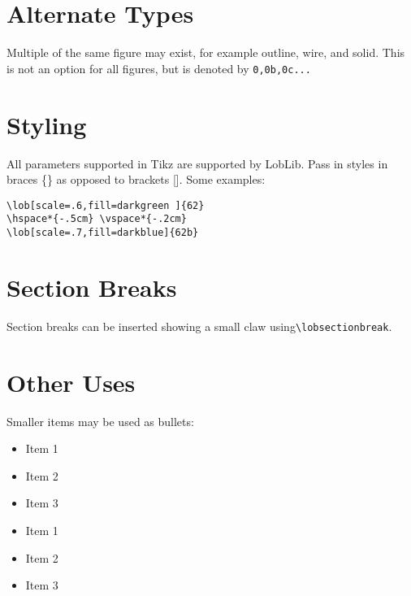 \documentclass[11pt]{article}
\begin{document}
\section*{Alternate Types}
Multiple of the same figure may exist, for example outline, wire, and solid. This is not an option for all figures, but is denoted by \texttt{0,0b,0c...}\\

\vspace*{1em}




\pagebreak

\section*{Styling}
All parameters supported in Tikz are supported by LobLib. Pass in styles in braces \{\} as opposed to brackets []. Some examples:
\vspace*{1cm}

\begin{multicols}{2}
\begin{verbatim}
\lob[scale=.6,fill=darkgreen ]{62}   
\hspace*{-.5cm} \vspace*{-.2cm}
\lob[scale=.7,fill=darkblue]{62b}
\end{verbatim}

\hspace*{-.5cm} \vspace*{-.2cm} 
\end{multicols}

\section*{Section Breaks}
Section breaks can be inserted showing a small claw using\texttt{\textbackslash lobsectionbreak}.

\lobsectionbreak

\section*{Other Uses}
Smaller items may be used as bullets:

\begin{multicols}{2} 
\begin{itemize}
\item[\lobclaw{simple}] Item 1
\item[\lobclaw{simple}] Item 2
\item[\lobclaw{simple}] Item 3
\end{itemize}

\begin{itemize}
\item[\lob{29}] Item 1
\item[\lob{29}] Item 2
\item[\lob{29}] Item 3
\end{itemize}
\end{multicols} 
\end{document}
